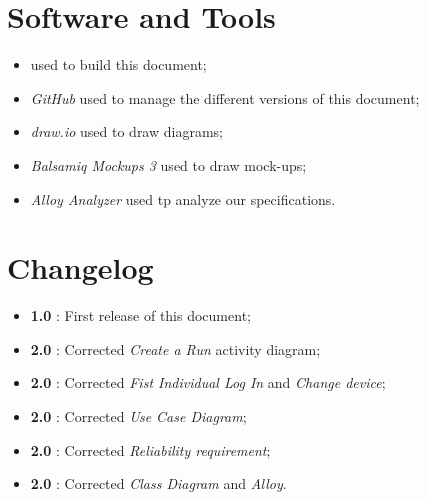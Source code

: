 \section{Software and Tools}
\begin{itemize}
  \item \text{\LaTeX} used to build this document;
  \item \textit{GitHub} used to manage the different versions of this document;
  \item \textit{draw.io} used to draw diagrams;
  \item \textit{Balsamiq Mockups 3} used to draw mock-ups;
  \item \textit{Alloy Analyzer} used tp analyze our specifications.
\end{itemize}


\section{Changelog}
\begin{itemize}
  \item \textbf{1.0} : First release of this document;
  \item \textbf{2.0} : Corrected \textit{Create a Run} activity diagram;
  \item \textbf{2.0} : Corrected \textit{Fist Individual Log In} and \textit{Change device};
  \item \textbf{2.0} : Corrected \textit{Use Case Diagram};
  \item \textbf{2.0} : Corrected \textit{Reliability requirement};
  \item \textbf{2.0} : Corrected \textit{Class Diagram} and \textit{Alloy}.
\end{itemize}
